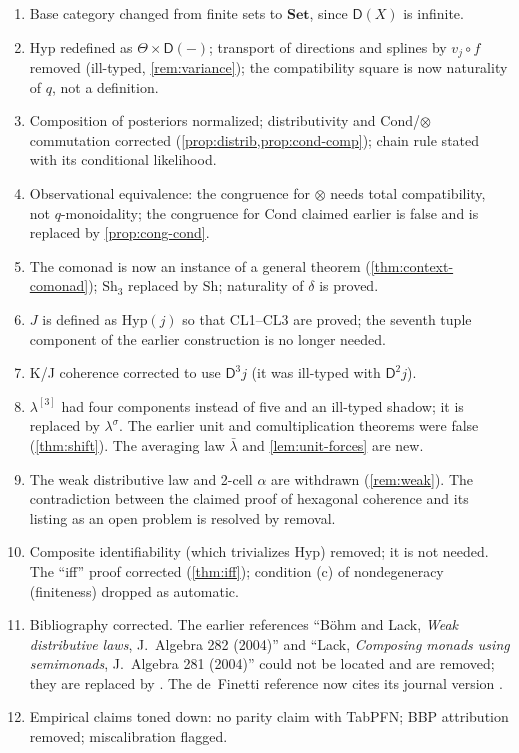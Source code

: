 \documentclass[11pt]{article}
\theoremstyle{definition}
\theoremstyle{remark}
\newcommand{\D}{\mathsf{D}}
\newcommand{\Set}{\mathbf{Set}}
\newcommand{\Hyp}{\mathrm{Hyp}}
\newcommand{\Sh}{\mathrm{Sh}}
\newcommand{\Cond}{\mathrm{Cond}}
\newcommand{\lb}{\bar\lambda}
\newcommand{\ls}{\lambda^{\sigma}}
\begin{document}
\begin{enumerate}[leftmargin=*]
\item Base category changed from finite sets to $\Set$, since $\D(X)$ is infinite.
\item $\Hyp$ redefined as $\Theta\times\D(-)$; transport of directions and splines by $v_j\circ f$
  removed (ill-typed, \cref{rem:variance}); the compatibility square is now naturality of $q$, not a
  definition.
\item Composition of posteriors normalized; distributivity and $\Cond$/$\otimes$ commutation
  corrected (\cref{prop:distrib,prop:cond-comp}); chain rule stated with its conditional likelihood.
\item Observational equivalence: the congruence for $\otimes$ needs total compatibility, not
  $q$-monoidality; the congruence for $\Cond$ claimed earlier is false and is replaced by
  \cref{prop:cong-cond}.
\item The comonad is now an instance of a general theorem (\cref{thm:context-comonad}); $\Sh_3$
  replaced by $\Sh$; naturality of $\delta$ is proved.
\item $J$ is defined as $\Hyp(j)$ so that CL1--CL3 are proved; the seventh tuple component of the
  earlier construction is no longer needed.
\item K/J coherence corrected to use $\D^3j$ (it was ill-typed with $\D^2j$).
\item $\lambda^{[3]}$ had four components instead of five and an ill-typed shadow; it is replaced by
  $\ls$. The earlier unit and comultiplication theorems were false (\cref{thm:shift}). The averaging
  law $\lb$ and \cref{lem:unit-forces} are new.
\item The weak distributive law and 2-cell $\alpha$ are withdrawn (\cref{rem:weak}). The contradiction
  between the claimed proof of hexagonal coherence and its listing as an open problem is resolved by
  removal.
\item Composite identifiability (which trivializes $\Hyp$) removed; it is not needed. The
  ``iff'' proof corrected (\cref{thm:iff}); condition (c) of nondegeneracy (finiteness) dropped as
  automatic.
\item Bibliography corrected. The earlier references ``B\"ohm and Lack, \emph{Weak distributive laws},
  J.~Algebra 282 (2004)'' and ``Lack, \emph{Composing monads using semimonads}, J.~Algebra 281 (2004)''
  could not be located and are removed; they are replaced by \cite{Street2009,Bohm2010,
  BohmLackStreet2011,Garner2020,GoyPetrisan2020,PowerWatanabe2002,Beck1969}. The de~Finetti reference
  now cites its journal version \cite{FGP2021}.
\item Empirical claims toned down: no parity claim with TabPFN; BBP attribution removed;
  miscalibration flagged.
\end{enumerate}
\end{document}
